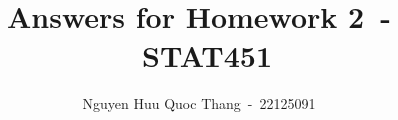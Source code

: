 \documentclass[12pt,a4paper]{article}
\begin{document}
\title{Answers for Homework 2~-~STAT451}
\author{Nguyen Huu Quoc Thang~-~22125091}

\maketitle





\end{document}
